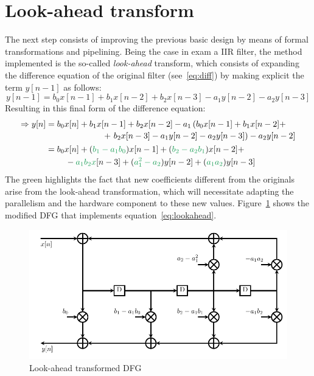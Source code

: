\documentclass[a4paper]{article}
\begin{document}
\section{Look-ahead transform}\label{sec:improv}
The next step consists of improving the previous basic design by means of formal transformations and pipelining. Being the case in exam a IIR filter, the method implemented is the so-called \emph{look-ahead} transform, which consists of expanding the difference equation of the original filter (see~\ref{eq:diff}) by making explicit the term $y[n-1]$ as follows:
\begin{equation*}
    y[n-1] = b_0x[n-1] + b_1x[n-2] + b_2x[n-3] - a_1y[n-2] - a_2y[n-3]
\end{equation*}
Resulting in this final form of the difference equation:
\begin{equation}\label{eq:lookahead}
\begin{split}
    \Rightarrow y[n] &= \!\begin{multlined}[t]
        b_0x[n] + b_1x[n-1] + b_2x[n-2] - a_1\left(b_0x[n-1]+ b_1x[n-2]+\right. \\
        \left. +\ b_2x[n-3] - a_1y[n-2] - a_2y[n-3]\right) - a_2y[n-2]
    \end{multlined} \\
    &= \!\begin{multlined}[t]
        b_0x[n] + (\textcolor{ForestGreen}{b_1-a_1b_0})x[n-1] + (\textcolor{ForestGreen}{b_2-a_2b_1})x[n-2] + \\
        -\textcolor{ForestGreen}{a_1b_2x}[n-3] + (\textcolor{ForestGreen}{a_1^2-a_2})y[n-2] + (\textcolor{ForestGreen}{a_1a_2})y[n-3]
    \end{multlined} \\   
\end{split}
\end{equation}
The green highlights the fact that new coefficients different from the originals arise from the look-ahead transformation, which will necessitate adapting the parallelism and the hardware component to these new values.
Figure~\ref{fig:lookahead_dfg} shows the modified DFG that implements equation~\ref{eq:lookahead}.

\begin{figure}[hbtp]
    \centering
    \includegraphics[width=.9\linewidth]{media/lookahead_dfg.pdf}
    \caption{Look-ahead transformed DFG}
    \label{fig:lookahead_dfg}
\end{figure}
\end{document}
